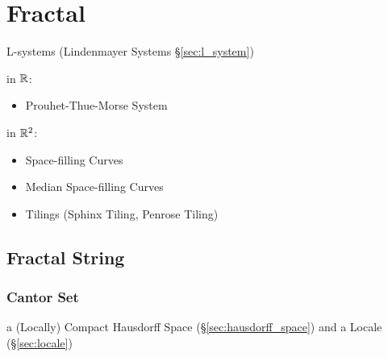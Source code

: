 \section{Fractal}\label{sec:fractal}

\asterism

L-systems (Lindenmayer Systems \S\ref{sec:l_system})


in $\mathbb{R}$:
\begin{itemize}
  \item Prouhet-Thue-Morse System
\end{itemize}

in $\mathbb{R}^2$:
\begin{itemize}
  \item Space-filling Curves
  \item Median Space-filling Curves
  \item Tilings (Sphinx Tiling, Penrose Tiling)
\end{itemize}



\subsection{Fractal String}\label{sec:fractal_string}

\subsubsection{Cantor Set}\label{sec:cantor_set}

a (Locally) Compact Hausdorff Space (\S\ref{sec:hausdorff_space}) and a Locale
(\S\ref{sec:locale})

